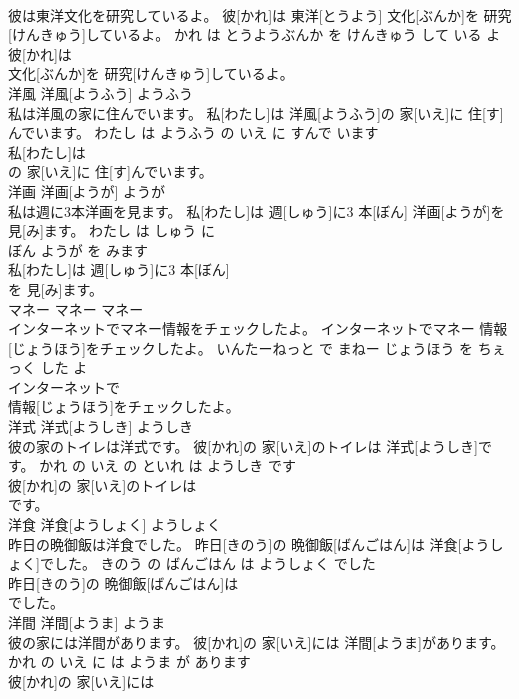 \documentclass[8pt]{extreport}
\begin{document}
\begin{CJK}{UTF8}{min}
\\	彼は東洋文化を研究しているよ。	彼[かれ]は 東洋[とうよう] 文化[ぶんか]を 研究[けんきゅう]しているよ。	かれ は とうようぶんか を けんきゅう して いる よ	
\\	彼[かれ]は
\\	文化[ぶんか]を 研究[けんきゅう]しているよ。			
\\	洋風	洋風[ようふう]	ようふう	
\\	私は洋風の家に住んでいます。	私[わたし]は 洋風[ようふう]の 家[いえ]に 住[す]んでいます。	わたし は ようふう の いえ に すんで います	
\\	私[わたし]は
\\	の 家[いえ]に 住[す]んでいます。			
\\	洋画	洋画[ようが]	ようが	
\\	私は週に3本洋画を見ます。	私[わたし]は 週[しゅう]に3 本[ぼん] 洋画[ようが]を 見[み]ます。	わたし は しゅう に 
\\	ぼん ようが を みます	
\\	私[わたし]は 週[しゅう]に3 本[ぼん]
\\	を 見[み]ます。			
\\	マネー	マネー	マネー	
\\	インターネットでマネー情報をチェックしたよ。	インターネットでマネー 情報[じょうほう]をチェックしたよ。	いんたーねっと で まねー じょうほう を ちぇっく した よ	
\\	インターネットで
\\	情報[じょうほう]をチェックしたよ。			
\\	洋式	洋式[ようしき]	ようしき	
\\	彼の家のトイレは洋式です。	彼[かれ]の 家[いえ]のトイレは 洋式[ようしき]です。	かれ の いえ の といれ は ようしき です	
\\	彼[かれ]の 家[いえ]のトイレは
\\	です。			
\\	洋食	洋食[ようしょく]	ようしょく	
\\	昨日の晩御飯は洋食でした。	昨日[きのう]の 晩御飯[ばんごはん]は 洋食[ようしょく]でした。	きのう の ばんごはん は ようしょく でした	
\\	昨日[きのう]の 晩御飯[ばんごはん]は
\\	でした。			
\\	洋間	洋間[ようま]	ようま	
\\	彼の家には洋間があります。	彼[かれ]の 家[いえ]には 洋間[ようま]があります。	かれ の いえ に は ようま が あります	
\\	彼[かれ]の 家[いえ]には

\end{CJK}
\end{document}
